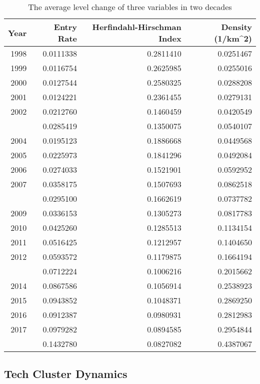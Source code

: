 \documentclass[
  12pt,
  oneside]{book}
\begin{document}
\begin{table}

\caption{\label{tab:tab-all-var-trend}The average level change of three variables in two decades}
\centering
\begin{tabular}[t]{rrrr}
\toprule
\textbf{Year} & \textbf{Entry Rate} & \textbf{Herfindahl-Hirschman Index} & \textbf{Density (1/km\textasciicircum{}2)}\\
\midrule
1998 & 0.0111338 & 0.2811410 & 0.0251467\\
1999 & 0.0116754 & 0.2625985 & 0.0255016\\
2000 & 0.0127544 & 0.2580325 & 0.0288208\\
2001 & 0.0124221 & 0.2361455 & 0.0279131\\
2002 & 0.0212760 & 0.1460459 & 0.0420549\\
\addlinespace
2003 & 0.0285419 & 0.1350075 & 0.0540107\\
2004 & 0.0195123 & 0.1886668 & 0.0449568\\
2005 & 0.0225973 & 0.1841296 & 0.0492084\\
2006 & 0.0274033 & 0.1521901 & 0.0592952\\
2007 & 0.0358175 & 0.1507693 & 0.0862518\\
\addlinespace
2008 & 0.0295100 & 0.1662619 & 0.0737782\\
2009 & 0.0336153 & 0.1305273 & 0.0817783\\
2010 & 0.0425260 & 0.1285513 & 0.1134154\\
2011 & 0.0516425 & 0.1212957 & 0.1404650\\
2012 & 0.0593572 & 0.1179875 & 0.1664194\\
\addlinespace
2013 & 0.0712224 & 0.1006216 & 0.2015662\\
2014 & 0.0867586 & 0.1056914 & 0.2538923\\
2015 & 0.0943852 & 0.1048371 & 0.2869250\\
2016 & 0.0912387 & 0.0980931 & 0.2812983\\
2017 & 0.0979282 & 0.0894585 & 0.2954844\\
\addlinespace
2018 & 0.1432780 & 0.0827082 & 0.4387067\\
\bottomrule
\end{tabular}
\end{table}

\hypertarget{tech-cluster-dynamics}{%
\subsection{Tech Cluster Dynamics}\label{tech-cluster-dynamics}}
\end{document}
